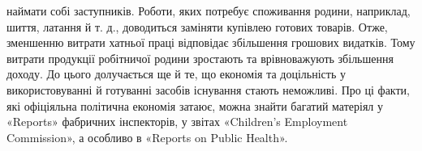 наймати собі заступників. Роботи, яких потребує споживання родини,
наприклад, шиття, латання й т. д., доводиться заміняти купівлею готових
товарів. Отже, зменшенню витрати хатньої праці відповідає збільшення
грошових видатків. Тому витрати продукції робітничої родини зростають
та врівноважують збільшення доходу. До цього долучається ще й те, що
економія та доцільність у використовуванні й готуванні засобів існування
стають неможливі. Про ці факти, які офіціяльна політична економія
затаює, можна знайти багатий матеріял у «Reports» фабричних інспекторів,
у звітах «Children’s Employment Commission», а особливо в «Reports
on Public Health».
\parbreak{}  %
